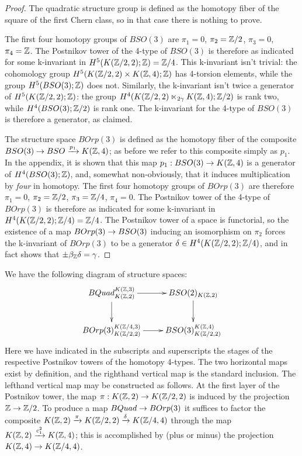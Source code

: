 \documentclass{amsart}
\begin{document}
\begin{proof}
The quadratic structure group is defined as the homotopy fiber of the square of the first Chern class, so in that case there is nothing to prove.

The first four homotopy groups of $BSO(3)$ are $\pi_1 = 0$, $\pi_2 = \mathbb Z/2$, $\pi_3 = 0$, $\pi_4 = \mathbb Z$.  The Postnikov tower of the 4-type of $BSO(3)$ is therefore as indicated for some k-invariant in $H^5(K(\mathbb Z/2,2);\mathbb Z) = \mathbb Z/4$.  This k-invariant isn't trivial: the cohomology group $H^5(K(\mathbb Z/2,2) \times K(\mathbb Z,4);\mathbb Z)$ has 4-torsion elements, while the group $H^5(BSO(3);\mathbb Z)$ does not.  Similarly, the k-invariant isn't twice a generator of $H^5(K(\mathbb Z/2,2);\mathbb Z)$: the group $H^4(K(\mathbb Z/2,2) \ltimes_{2\gamma} K(\mathbb Z,4);\mathbb Z/2)$ is rank two, while $H^4(BSO(3);\mathbb Z/2)$ is rank one.  The k-invariant for the 4-type of $BSO(3)$ is therefore a generator, as claimed.

The structure space $BOrp(3)$ is defined as the homotopy fiber of the composite $BSO(3) \rightarrow BSO \xrightarrow{p_1} K(\mathbb Z,4)$; as before we refer to this composite simply as $p_1$.  In the appendix, it is shown that this map $p_1: BSO(3) \rightarrow K(\mathbb Z,4)$ is a generator of $H^4(BSO(3);\mathbb Z)$, and, somewhat non-obviously, that it induces multiplication by \emph{four} in homotopy.  The first four homotopy groups of $BOrp(3)$ are therefore $\pi_1 = 0$, $\pi_2 = \mathbb Z/2$, $\pi_3 = \mathbb Z/4$, $\pi_4 = 0$.  The Postnikov tower of the 4-type of $BOrp(3)$ is therefore as indicated for some k-invariant in $H^4(K(\mathbb Z/2,2);\mathbb Z/4) = \mathbb Z/4$.  The Postnikov tower of a space is functorial, so the existence of a map $BOrp(3) \rightarrow BSO(3)$ inducing an isomorphism on $\pi_2$ forces the k-invariant of $BOrp(3)$ to be a generator $\delta \in H^4(K(\mathbb Z/2,2);\mathbb Z/4)$, and in fact shows that $\pm \beta_{\mathbb Z} \delta = \gamma$. 
\end{proof}

We have the following diagram of structure spaces:
\[
\xymatrix{
BQuad_{K(\ZZ,2)}^{K(\ZZ,3)} \ar[r] \ar[d] & BSO(2)_{K(\ZZ,2)} \ar[d] \\
BOrp(3)_{K(\ZZ/2,2)}^{K(\ZZ/4,3)} \ar[r] & BSO(3)_{K(\ZZ/2,2)}^{K(\ZZ,4)}
}
\]
Here we have indicated in the subscripts and superscripts the stages of the respective Postnikov towers of the homotopy 4-types.  The two horizontal maps exist by definition, and the righthand vertical map is the standard inclusion.  The lefthand vertical map may be constructed as follows.  At the first layer of the Postnikov tower, the map $\pi: K(\mathbb Z,2) \rightarrow K(\mathbb Z/2,2)$ is induced by the projection $\mathbb Z \rightarrow \mathbb Z/2$.  To produce a map $BQuad \rightarrow BOrp(3)$ it suffices to factor the composite $K(\mathbb Z,2) \xrightarrow{\pi} K(\mathbb Z/2,2) \xrightarrow{\delta} K(\mathbb Z/4,4)$ through the map $K(\mathbb Z,2) \xrightarrow{c_1^2} K(\mathbb Z,4)$; this is accomplished by (plus or minus) the projection $K(\mathbb Z,4) \rightarrow K(\mathbb Z/4,4)$.  %
\end{document}

